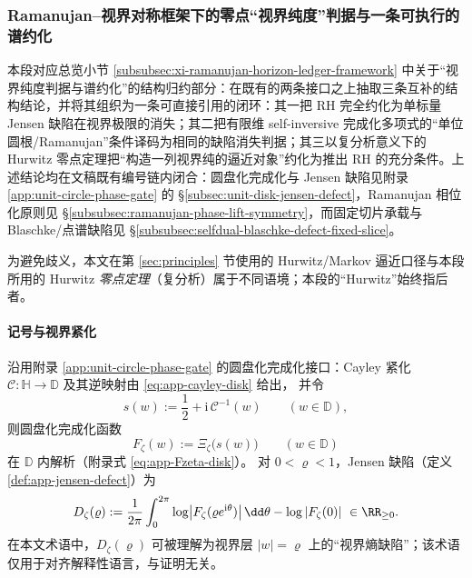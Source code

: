 \subsubsection{Ramanujan--视界对称框架下的零点“视界纯度”判据与一条可执行的谱约化}\label{subsubsec:xi-ramanujan-horizon-purity-spectral-reduction}
本段对应总览小节 \ref{subsubsec:xi-ramanujan-horizon-ledger-framework} 中关于“视界纯度判据与谱约化”的结构归约部分：在既有的两条接口之上抽取三条互补的结构结论，并将其组织为一条可直接引用的闭环：其一把 RH 完全约化为单标量 Jensen 缺陷在视界极限的消失；其二把有限维 self-inversive 完成化多项式的“单位圆根/Ramanujan”条件译码为相同的缺陷消失判据；其三以复分析意义下的 Hurwitz 零点定理把“构造一列视界纯的逼近对象”约化为推出 RH 的充分条件。上述结论均在文稿既有编号链内闭合：圆盘化完成化与 Jensen 缺陷见附录 \ref{app:unit-circle-phase-gate} 的 \S\ref{subsec:unit-disk-jensen-defect}，Ramanujan 相位化原则见 \S\ref{subsubsec:ramanujan-phase-lift-symmetry}，而固定切片承载与 Blaschke/点谱缺陷见 \S\ref{subsubsec:selfdual-blaschke-defect-fixed-slice}。
\par
为避免歧义，本文在第 \ref{sec:principles} 节使用的 Hurwitz/Markov 逼近口径与本段所用的 Hurwitz \emph{零点定理}（复分析）属于不同语境；本段的“Hurwitz”始终指后者。

\paragraph{记号与视界紧化}
沿用附录 \ref{app:unit-circle-phase-gate} 的圆盘化完成化接口：Cayley 紧化 \(\mathcal{C}:\mathbb{H}\to\mathbb{D}\) 及其逆映射由 \eqref{eq:app-cayley-disk} 给出，
并令
\begin{equation}\label{eq:xi-ramanujan-horizon-s-of-w}
s(w):=\frac12+\mathrm{i}\,\mathcal{C}^{-1}(w)\qquad(w\in\mathbb{D}),
\end{equation}
则圆盘化完成化函数
\begin{equation}\label{eq:xi-ramanujan-horizon-Fzeta}
F_{\zeta}(w):=\Xi_{\zeta}\!\bigl(s(w)\bigr)\qquad(w\in\mathbb{D})
\end{equation}
在 \(\mathbb{D}\) 内解析（附录式 \eqref{eq:app-Fzeta-disk}）。
对 \(0<\varrho<1\)，Jensen 缺陷（定义 \ref{def:app-jensen-defect}）为
\begin{equation}\label{eq:xi-ramanujan-horizon-jensen-defect}
D_{\zeta}(\varrho)
:=\frac{1}{2\pi}\int_{0}^{2\pi}\log\bigl|F_{\zeta}(\varrho e^{\mathrm{i}\theta})\bigr|\,\dd\theta-\log|F_{\zeta}(0)|\ \in\RR_{\ge 0}.
\end{equation}
在本文术语中，\(D_{\zeta}(\varrho)\) 可被理解为视界层 \(|w|=\varrho\) 上的“视界熵缺陷”；该术语仅用于对齐解释性语言，与证明无关。

